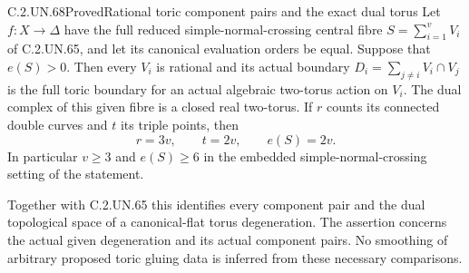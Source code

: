 \begin{statement}{C.2.UN.68}{Proved}{Rational toric component pairs and the exact dual torus}
Let $f:X\to\Delta$ have the full reduced simple-normal-crossing
central fibre $S=\sum_{i=1}^{v}V_i$ of C.2.UN.65, and let its
canonical evaluation orders be equal. Suppose that $e(S)>0$.
Then every $V_i$ is rational and its actual boundary
$D_i=\sum_{j\ne i}V_i\cap V_j$ is the full toric boundary
for an actual algebraic two-torus action on $V_i$.
The dual complex of this given fibre is a closed real
two-torus. If $r$ counts its connected double curves and
$t$ its triple points, then
\[
                  r=3v,\qquad t=2v,\qquad e(S)=2v.
\tag{C.TC.1}
\]
In particular $v\ge3$ and $e(S)\ge6$ in the embedded
simple-normal-crossing setting of the statement.

Together with C.2.UN.65 this identifies every component
pair and the dual topological space of a canonical-flat
torus degeneration. The assertion concerns the actual
given degeneration and its actual component pairs.
No smoothing of arbitrary proposed toric gluing data
is inferred from these necessary comparisons.
\end{statement}

